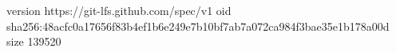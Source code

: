 version https://git-lfs.github.com/spec/v1
oid sha256:48acfc0a17656f83b4ef1b6e249e7b10bf7ab7a072ca984f3bae35e1b178a00d
size 139520
